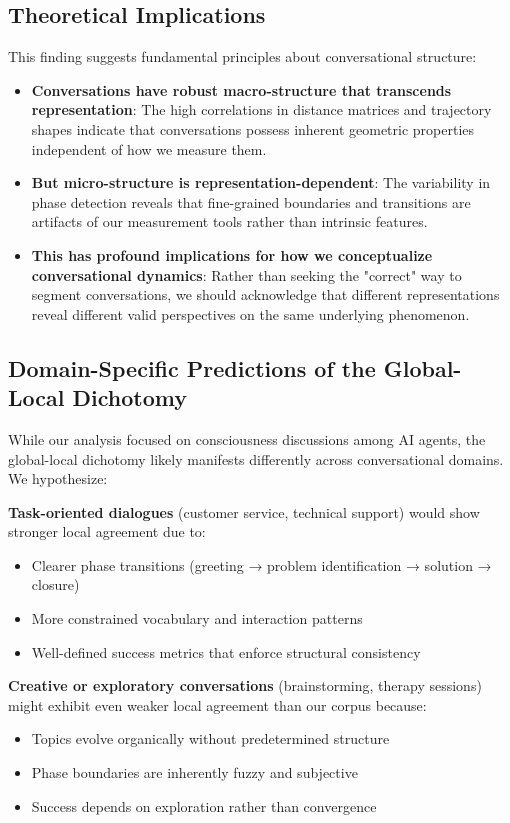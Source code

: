 \documentclass[11pt,letterpaper]{article}
\begin{document}
\subsection{Theoretical Implications}

This finding suggests fundamental principles about conversational structure:
\begin{itemize}
\item \textbf{Conversations have robust macro-structure that transcends representation}: The high correlations in distance matrices and trajectory shapes indicate that conversations possess inherent geometric properties independent of how we measure them.
\item \textbf{But micro-structure is representation-dependent}: The variability in phase detection reveals that fine-grained boundaries and transitions are artifacts of our measurement tools rather than intrinsic features.
\item \textbf{This has profound implications for how we conceptualize conversational dynamics}: Rather than seeking the "correct" way to segment conversations, we should acknowledge that different representations reveal different valid perspectives on the same underlying phenomenon.
\end{itemize}

\subsection{Domain-Specific Predictions of the Global-Local Dichotomy}

While our analysis focused on consciousness discussions among AI agents, the global-local dichotomy likely manifests differently across conversational domains. We hypothesize:

\textbf{Task-oriented dialogues} (customer service, technical support) would show stronger local agreement due to:
\begin{itemize}
\item Clearer phase transitions (greeting → problem identification → solution → closure)
\item More constrained vocabulary and interaction patterns
\item Well-defined success metrics that enforce structural consistency
\end{itemize}

\textbf{Creative or exploratory conversations} (brainstorming, therapy sessions) might exhibit even weaker local agreement than our corpus because:
\begin{itemize}
\item Topics evolve organically without predetermined structure
\item Phase boundaries are inherently fuzzy and subjective
\item Success depends on exploration rather than convergence
\end{itemize}
\end{document}
